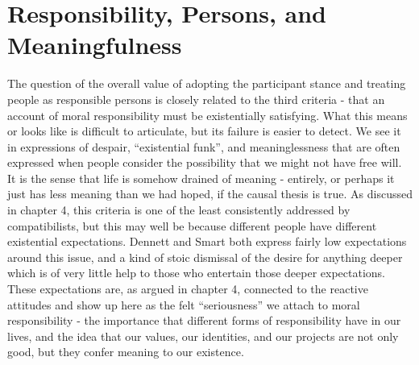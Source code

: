 \documentclass[phd,12pt,oneside,paper=letterpaper]{ubcthesis}
\begin{document}
\section{Responsibility, Persons, and Meaningfulness}
The question of the overall value of adopting the participant stance and treating people as responsible persons is closely related to the third criteria - that an account of moral responsibility must be existentially satisfying. What this means or looks like is difficult to articulate, but its failure is easier to detect. We see it in expressions of despair, ``existential funk'', and meaninglessness that are often expressed when people consider the possibility that we might not have free will. It is the sense that life is somehow drained of meaning - entirely, or perhaps it just has less meaning than we had hoped, if the causal thesis is true. As discussed in chapter 4, this criteria is one of the least consistently addressed by compatibilists, but this may well be because different people have different existential expectations. Dennett and Smart both express fairly low expectations around this issue, and a kind of stoic dismissal of the desire for anything deeper which is of very little help to those who entertain those deeper expectations. These expectations are, as argued in chapter 4, connected to the reactive attitudes and show up here as the felt ``seriousness'' we attach to moral responsibility - the importance that different forms of responsibility have in our lives, and the idea that our values, our identities, and our projects are not only good, but they confer meaning to our existence. 
\end{document}
